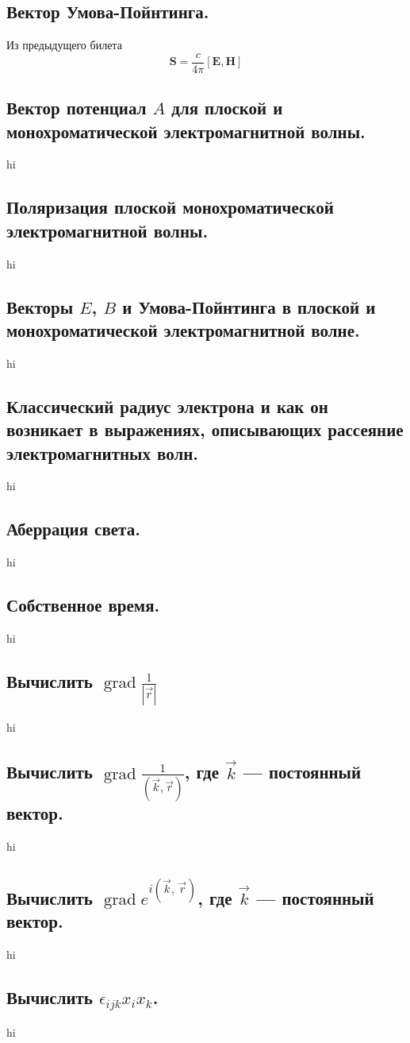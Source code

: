 \documentclass[a4paper,12pt]{article}
\begin{document}
\subsection{Вектор Умова-Пойнтинга.}
Из предыдущего билета \[\mathbf{S}=\frac{c}{4\pi}[\mathbf{E},\mathbf{H}]\]
\subsection{Вектор потенциал $A$ для плоской и монохроматической
электромагнитной
волны.}
hi
\subsection{Поляризация плоской монохроматической электромагнитной волны.}
hi
\subsection{Векторы $E$, $B$ и Умова-Пойнтинга в плоской и монохроматической
электромагнитной волне.}
hi
\subsection{Классический радиус электрона и как он возникает в выражениях,
описывающих рассеяние электромагнитных волн.}
hi
\subsection{Аберрация света.}
hi
\subsection{Собственное время.}
hi
\subsection{Вычислить $\operatorname{grad} \frac{1}{\left| \vec{r} \right| }$}
hi
\subsection{Вычислить $\operatorname{grad}
	\frac{1}{\left( \vec{k},\vec{r}\right)}
$, где $\vec{k}$ --- постоянный вектор.}
hi
\subsection{Вычислить $\operatorname{grad} e ^{i\left( \vec{k},\,\vec{r}
\right) }$, где $\vec{k}$ --- постоянный вектор.}
hi
\subsection{Вычислить $\epsilon_{ijk}x_i x_k$.}
hi
\end{document}
